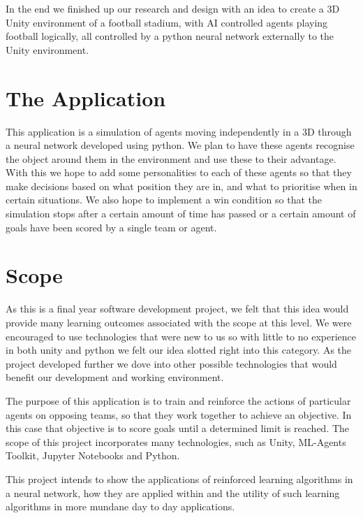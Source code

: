 In the end we finished up our research and design with an idea to create a 3D Unity environment of a football stadium, with AI controlled agents playing football logically, all controlled by a python neural network externally to the Unity environment.


\section{The Application}
This application is a simulation of agents moving independently in a 3D through a neural network developed using python. We plan to have these agents recognise the object around them in the environment and use these to their advantage. With this we hope to add some personalities to each of these agents so that they make decisions based on what position they are in, and what to prioritise when in certain situations. We also hope to implement a win condition so that the simulation stops after a certain amount of time has passed or a certain amount of goals have been scored by a single team or agent.

\section{Scope}
As this is a final year software development project, we felt that this idea would provide many learning outcomes associated with the scope at this level. We were encouraged to use technologies that were new to us so with little to no experience in both unity and python we felt our idea slotted right into this category. As the project developed further we dove into other possible technologies that would benefit our development and working environment.

The purpose of this application is to train and reinforce the actions of particular agents on opposing teams, so that they work together to achieve an objective. In this case that objective is to score goals until a determined limit is reached. The scope of this project incorporates many technologies, such as Unity, ML-Agents Toolkit, Jupyter Notebooks and Python. 

This project intends to show the applications of reinforced learning algorithms in a neural network, how they are applied within and the utility of such learning algorithms in more mundane day to day applications.

